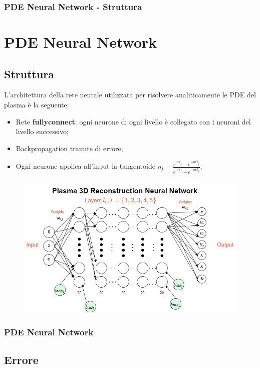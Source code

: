 \documentclass{beamer}
\begin{document}
\begin{frame}
	\frametitle{PDE Neural Network - Struttura} %
	\section{PDE Neural Network}
	\subsection{Struttura}
	L'architettura della rete neurale utilizzata per risolvere analiticamente le PDE del plasma è la seguente:
	\begin{itemize}
		\item Rete \textbf{fullyconnect}: ogni neurone di ogni livello è collegato con i neuroni del livello successivo;
		\item Backpropagation tramite di errore;
		\item Ogni neurone applica all'input la tangentoide \(o_{j}=\frac{e^{net_{j}}-e^{-net_{j}}}{e^{net_{j}}+e^{-net_{j}}}\);
	\end{itemize}
	\begin{figure}
		\includegraphics[scale=0.3]{reteOrganizzazione.png}
	\end{figure}

\end{frame}
\begin{frame}
	\frametitle{PDE Neural Network}
	\subsection{Errore}
	\vspace{-0.1cm}
		\begin{figure}
		\end{figure}
\end{frame}
\end{document}
